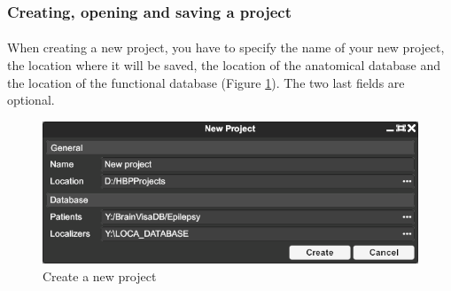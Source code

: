 \documentclass[a4paper]{article}
\begin{document}
\subsubsection{Creating, opening and saving a project}
\paragraph{} When creating a new project, you have to specify the name of your new project, the location where it will be saved, the location of the anatomical database and the location of the functional database (Figure \ref{newProjectUI}). The two last fields are optional.
\begin{figure}[H]
\begin{center}
\includegraphics[scale=0.5]{NewProject.png}
\end{center}
\caption{\label{newProjectUI}Create a new project}
\end{figure}
\end{document}
